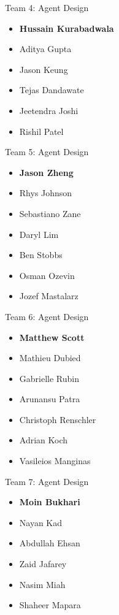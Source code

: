 Team 4: Agent Design
\begin{itemize}
    \item \textbf{Hussain Kurabadwala}
    \item Aditya Gupta
    \item Jason Keung
    \item Tejas Dandawate
    \item Jeetendra Joshi
    \item Rishil Patel
\end{itemize}

Team 5: Agent Design
\begin{itemize}
    \item \textbf{Jason Zheng}
    \item Rhys Johnson
    \item Sebastiano Zane
    \item Daryl Lim
    \item Ben Stobbs
    \item Osman Ozevin
    \item Jozef Mastalarz
\end{itemize}

Team 6: Agent Design
\begin{itemize}
    \item \textbf{Matthew Scott}
    \item Mathieu Dubied
    \item Gabrielle Rubin
    \item Arunansu Patra
    \item Christoph Renschler
    \item Adrian Koch
    \item Vasileios Manginas
\end{itemize}

Team 7: Agent Design
\begin{itemize}
    \item \textbf{Moin Bukhari}
    \item Nayan Kad
    \item Abdullah Ehsan
    \item Zaid Jafarey
    \item Nasim Miah
    \item Shaheer Mapara
\end{itemize}
